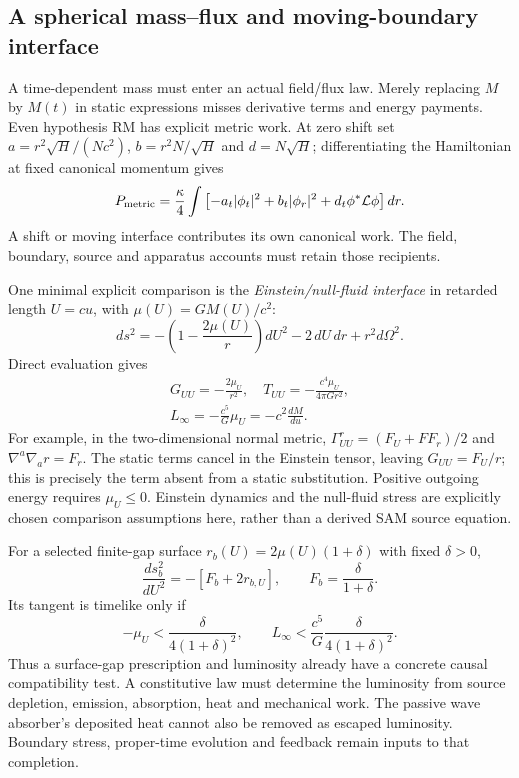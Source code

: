 \documentclass[10pt,twocolumn,letterpaper]{article}
\begin{document}
\subsection{A spherical mass--flux and moving-boundary interface}
A time-dependent mass must enter an actual field/flux law. Merely replacing
$M$ by $M(t)$ in static expressions misses derivative terms and energy
payments. Even hypothesis RM has explicit metric work. At zero shift set
$a=r^2\sqrt H/(Nc^2)$, $b=r^2N/\sqrt H$ and $d=N\sqrt H$; differentiating
the Hamiltonian at fixed canonical momentum gives
\begin{equation}
 P_{\rm metric}=\frac\kappa4\int
 \left[-a_t|\phi_t|^2+b_t|\phi_r|^2
                 +d_t\phi^*\mathcal L\phi\right]dr.
 \label{eq:dy-metric-work}
\end{equation}
A shift or moving interface contributes its own canonical work. The
field, boundary, source and apparatus accounts must retain those recipients.

One minimal explicit comparison is the \emph{Einstein/null-fluid interface}
in retarded length $U=cu$, with $\mu(U)=GM(U)/c^2$:
\begin{equation}
 ds^2=-\left(1-\frac{2\mu(U)}r\right)dU^2
                  -2\,dU\,dr+r^2d\Omega^2.
 \label{eq:dy-Vaidya}
\end{equation}
Direct evaluation gives
\begin{equation}
\begin{gathered}G_{UU}=-\frac{2\mu_U}{r^2},\quad T_{UU}=-\frac{c^4\mu_U}{4\pi G r^2},\\
 L_\infty=-\frac{c^5}{G}\mu_U=-c^2\frac{dM}{du}.\end{gathered}
 \label{eq:dy-flux}
\end{equation}
For example, in the two-dimensional normal metric,
$\Gamma^r_{UU}=(F_U+FF_r)/2$ and $\nabla^a\nabla_a r=F_r$.
The static terms cancel in the Einstein tensor, leaving
$G_{UU}=F_U/r$; this is precisely the term absent from a static
substitution. Positive outgoing energy requires $\mu_U\leq0$.
Einstein dynamics and the null-fluid stress are explicitly chosen
comparison assumptions here, rather than a derived SAM source equation.

For a selected finite-gap surface
$r_b(U)=2\mu(U)(1+\delta)$ with fixed $\delta>0$,
\begin{equation}
 \frac{ds_b^2}{dU^2}=-[F_b+2r_{b,U}],\qquad
 F_b=\frac\delta{1+\delta}.
\end{equation}
Its tangent is timelike only if
\begin{equation}
 -\mu_U<\frac\delta{4(1+\delta)^2},\qquad
 L_\infty<\frac{c^5}{G}\frac\delta{4(1+\delta)^2}.
 \label{eq:dy-worldtube}
\end{equation}
Thus a surface-gap prescription and luminosity already have a concrete
causal compatibility test. A constitutive law must determine the luminosity
from source depletion, emission, absorption, heat and mechanical work. The
passive wave absorber's deposited heat cannot also be removed as escaped
luminosity. Boundary stress, proper-time evolution and feedback remain
inputs to that completion.
\end{document}
